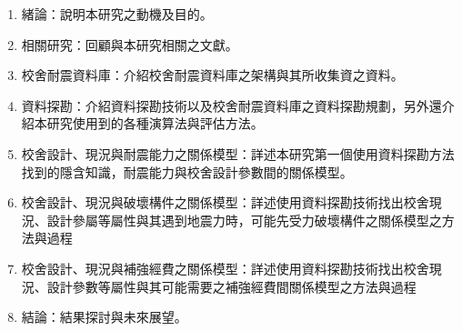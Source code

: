 \begin{enumerate}
\item 緒論：說明本研究之動機及目的。
\item 相關研究：回顧與本研究相關之文獻。
\item 校舍耐震資料庫：介紹校舍耐震資料庫之架構與其所收集資之資料。
\item 資料探勘：介紹資料探勘技術以及校舍耐震資料庫之資料探勘規劃，另外還介紹本研究使用到的各種演算法與評估方法。
\item 校舍設計、現況與耐震能力之關係模型：詳述本研究第一個使用資料探勘方法找到的隱含知識，耐震能力與校舍設計參數間的關係模型。
\item 校舍設計、現況與破壞構件之關係模型：詳述使用資料探勘技術找出校舍現況、設計參屬等屬性與其遇到地震力時，可能先受力破壞構件之關係模型之方法與過程
\item 校舍設計、現況與補強經費之關係模型：詳述使用資料探勘技術找出校舍現況、設計參數等屬性與其可能需要之補強經費間關係模型之方法與過程
\item 結論：結果探討與未來展望。
\end{enumerate}




